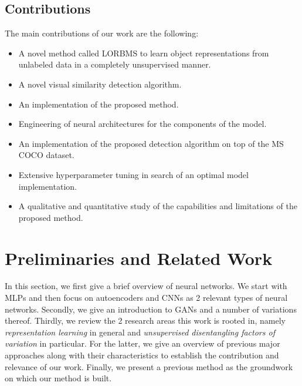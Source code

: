 \documentclass[a4paper,12pt]{report}
\begin{document}
\section{Contributions}
The main contributions of our work are the following:
\begin{itemize}
  \item A novel method called LORBMS to learn object representations from unlabeled data in a completely unsupervised manner.
  \item A novel visual similarity detection algorithm.
  \item An implementation of the proposed method.
  \item Engineering of neural architectures for the components of the model.
  \item An implementation of the proposed detection algorithm on top of the MS COCO dataset.
  \item Extensive hyperparameter tuning in search of an optimal model implementation.
  \item A qualitative and quantitative study of the capabilities and limitations of the proposed method.
\end{itemize}


\chapter{Preliminaries and Related Work}\label{sec:related_work}
In this section, we first give a brief overview of neural networks. We start with MLPs and then focus on autoencoders and CNNs as 2 relevant types of neural networks. Secondly, we give an introduction to GANs and a number of variations thereof. Thirdly, we review the 2 research areas this work is rooted in, namely \textit{representation learning} in general and \textit{unsupervised disentangling factors of variation} in particular. For the latter, we give an overview of previous major approaches along with their characteristics to establish the contribution and relevance of our work. Finally, we present a previous method as the groundwork on which our method is built.
\end{document}
